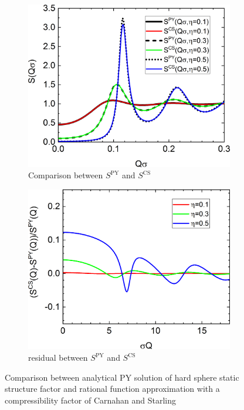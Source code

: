 \begin{figure}[htb]
\begin{subfigure}[b]{.48\textwidth}
   \centering
   \includegraphics[width=1\textwidth]{../images/structure_factor/HardSphere/SQCS.png}
   \caption{Comparison between $S^\mathrm{PY}$ and $S^\mathrm{CS}$}
   \label{fig:SQ:CS1}
\end{subfigure}
\hfill
\begin{subfigure}[b]{.48\textwidth}
   \centering
   \includegraphics[width=1\textwidth]{../images/structure_factor/HardSphere/ResCS.png}
   \caption{residual between $S^\mathrm{PY}$ and $S^\mathrm{CS}$}
   \label{fig:SQ:CS2}
\end{subfigure}
\caption{Comparison between analytical PY solution of hard sphere static structure factor and rational function approximation with a compressibility factor of Carnahan and Starling}
\label{fig:SQ:CS}
\end{figure}

